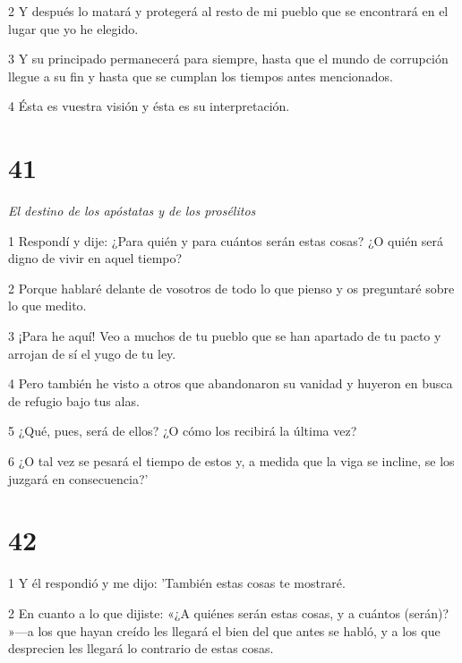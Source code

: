 \par 2 Y después lo matará y protegerá al resto de mi pueblo que se encontrará en el lugar que yo he elegido.

\par 3 Y su principado permanecerá para siempre, hasta que el mundo de corrupción llegue a su fin y hasta que se cumplan los tiempos antes mencionados.

\par 4 Ésta es vuestra visión y ésta es su interpretación.


\chapter{41}

\par \textit{El destino de los apóstatas y de los prosélitos}

\par 1 Respondí y dije: ¿Para quién y para cuántos serán estas cosas? ¿O quién será digno de vivir en aquel tiempo?

\par 2 Porque hablaré delante de vosotros de todo lo que pienso y os preguntaré sobre lo que medito.

\par 3 ¡Para he aquí! Veo a muchos de tu pueblo que se han apartado de tu pacto y arrojan de sí el yugo de tu ley.

\par 4 Pero también he visto a otros que abandonaron su vanidad y huyeron en busca de refugio bajo tus alas.

\par 5 ¿Qué, pues, será de ellos? ¿O cómo los recibirá la última vez?

\par 6 ¿O tal vez se pesará el tiempo de estos y, a medida que la viga se incline, se los juzgará en consecuencia?'

\chapter{42}

\par 1 Y él respondió y me dijo: 'También estas cosas te mostraré.

\par 2 En cuanto a lo que dijiste: «¿A quiénes serán estas cosas, y a cuántos (serán)? »—a los que hayan creído les llegará el bien del que antes se habló, y a los que desprecien les llegará lo contrario de estas cosas.

